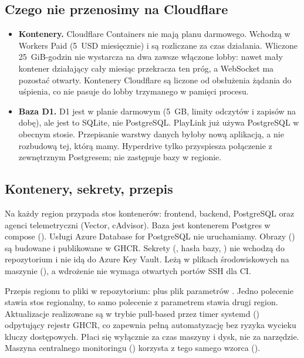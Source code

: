 \subsection{Czego nie przenosimy na Cloudflare}
\begin{itemize}
  \item \textbf{Kontenery.} Cloudflare Containers nie mają planu darmowego.
        Wchodzą w Workers Paid (5~USD miesięcznie) i są rozliczane za czas
        działania. Wliczone 25~GiB-godzin nie wystarcza na dwa zawsze włączone
        lobby: nawet mały kontener działający cały miesiąc przekracza ten próg,
        a WebSocket ma pozostać otwarty. Kontenery Cloudflare są liczone od
        obsłużenia żądania do uśpienia, co nie pasuje do lobby trzymanego w
        pamięci procesu.
  \item \textbf{Baza D1.} D1 jest w planie darmowym (5~GB, limity odczytów
        i zapisów na dobę), ale jest to SQLite, nie PostgreSQL. PlayLink już
        używa PostgreSQL w obecnym stosie. Przepisanie warstwy danych
        byłoby nową aplikacją, a nie rozbudową tej, którą mamy. Hyperdrive tylko
        przyspiesza połączenie z zewnętrznym Postgresem; nie zastępuje bazy
        w regionie.
\end{itemize}

\subsection{Kontenery, sekrety, przepis}
Na każdy region przypada stos kontenerów: frontend, backend,
PostgreSQL oraz agenci telemetryczni (Vector, cAdvisor). Baza jest kontenerem
Postgres w compose (). Usługi Azure Database for PostgreSQL nie
uruchamiamy. Obrazy () są budowane i publikowane w GHCR.
Sekrety (, hasła bazy, ) nie wchodzą do
repozytorium i nie idą do Azure Key Vault. Leżą w plikach środowiskowych na maszynie
(), a wdrożenie nie wymaga otwartych portów SSH dla CI.

Przepis regionu to pliki w repozytorium:  plus plik parametrów
. Jedno polecenie  stawia stos
regionalny, to samo polecenie z parametrem  stawia drugi region.
Aktualizacje realizowane są w trybie pull-based przez timer systemd
() odpytujący rejestr GHCR, co zapewnia pełną automatyzację
bez ryzyka wycieku kluczy dostępowych. Płaci się wyłącznie za czas maszyny i dysk,
nie za narzędzie. Maszyna centralnego monitoringu () korzysta z
tego samego wzorca ().


